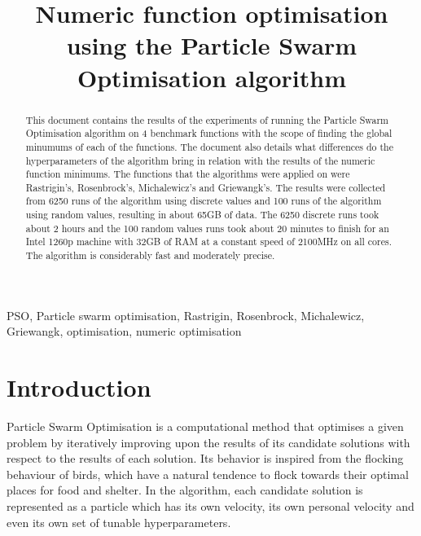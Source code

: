 \documentclass[conference]{IEEEtran}
\begin{document}
\title{Numeric function optimisation using the Particle Swarm Optimisation algorithm}

\author{
}
\maketitle

\begin{abstract}
    This document contains the results of the experiments of running the Particle Swarm Optimisation algorithm on 4 benchmark
    functions with the scope of finding the global minumums of each of the functions. The document also details what differences
    do the hyperparameters of the algorithm bring in relation with the results of the numeric function minimums. The functions
    that the algorithms were applied on were Rastrigin's, Rosenbrock's, Michalewicz's and Griewangk's. The results were collected
    from 6250 runs of the algorithm using discrete values and 100 runs of the algorithm using random values, resulting in about
    65GB of data. The 6250 discrete runs took about 2 hours and the 100 random values runs took about 20 minutes to finish for
    an Intel 1260p machine with 32GB of RAM at a constant speed of 2100MHz on all cores. The algorithm is considerably fast
    and moderately precise.
\end{abstract}

\begin{IEEEkeywords}
PSO, Particle swarm optimisation, Rastrigin, Rosenbrock, Michalewicz, Griewangk, optimisation, numeric optimisation
\end{IEEEkeywords}

\section{Introduction}
Particle Swarm Optimisation is a computational method that optimises a given problem by iteratively improving upon the results
of its candidate solutions with respect to the results of each solution. Its behavior is inspired from the flocking behaviour of birds,
which have a natural tendence to flock towards their optimal places for food and shelter. In the algorithm, each candidate solution is represented
as a particle which has its own velocity, its own personal velocity and even its own set of tunable hyperparameters.
\end{document}
